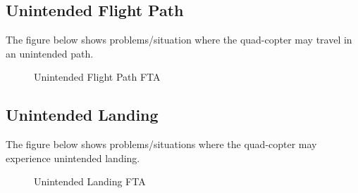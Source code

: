 \documentclass[10pt,letterpaper]{article}
\begin{document}
\newpage

\subsection{Unintended Flight Path}
 The figure below shows problems/situation where the quad-copter may travel in an unintended path.
\begin{figure}[h]
  \caption{Unintended Flight Path FTA}
  \label{fig:context_diagram}
\end{figure}
\newpage

\subsection{Unintended Landing}
The figure below shows problems/situations where the quad-copter may experience unintended landing.
\begin{figure}[h]
  \caption{Unintended Landing FTA}
  \label{fig:context_diagram}
\end{figure}
\end{document}
